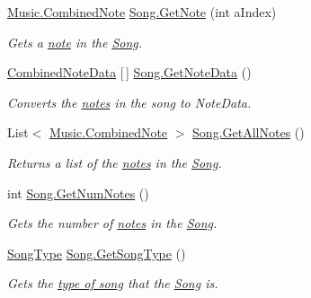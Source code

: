 \begin{DoxyCompactItemize}
\hyperlink{group___music_structs_struct_music_1_1_combined_note}{Music.\+Combined\+Note} \hyperlink{group___song_pub_func_ga485c83c9278103fed23c532bba1252f0}{Song.\+Get\+Note} (int a\+Index)
\begin{DoxyCompactList}\small\item\em Gets a \hyperlink{group___music_structs_struct_music_1_1_combined_note}{note} in the \hyperlink{class_song}{Song}. \end{DoxyCompactList}\item 
\hyperlink{group___song_structs_struct_song_1_1_combined_note_data}{Combined\+Note\+Data} \mbox{[}$\,$\mbox{]} \hyperlink{group___song_pub_func_gae3df1fd5448b7d9cefb0fed4af967985}{Song.\+Get\+Note\+Data} ()
\begin{DoxyCompactList}\small\item\em Converts the \hyperlink{group___music_structs_struct_music_1_1_combined_note}{notes} in the song to Note\+Data. \end{DoxyCompactList}\item 
List$<$ \hyperlink{group___music_structs_struct_music_1_1_combined_note}{Music.\+Combined\+Note} $>$ \hyperlink{group___song_pub_func_ga842675b7691fca074ee394031afc7675}{Song.\+Get\+All\+Notes} ()
\begin{DoxyCompactList}\small\item\em Returns a list of the \hyperlink{group___music_structs_struct_music_1_1_combined_note}{notes} in the \hyperlink{class_song}{Song}. \end{DoxyCompactList}\item 
int \hyperlink{group___song_pub_func_gad124d0af146885327f8ac455bc013b63}{Song.\+Get\+Num\+Notes} ()
\begin{DoxyCompactList}\small\item\em Gets the number of \hyperlink{group___music_structs_struct_music_1_1_combined_note}{notes} in the \hyperlink{class_song}{Song}. \end{DoxyCompactList}\item 
\hyperlink{group___song_enums_gae681a1f001333e39fc1cb4fea97bfe1b}{Song\+Type} \hyperlink{group___song_pub_func_gabae5b5d8f727b2d9da7867a99347f86b}{Song.\+Get\+Song\+Type} ()
\begin{DoxyCompactList}\small\item\em Gets the \hyperlink{group___song_enums_gae681a1f001333e39fc1cb4fea97bfe1b}{type of song} that the \hyperlink{class_song}{Song} is. \end{DoxyCompactList}\item 

\end{DoxyCompactItemize}
